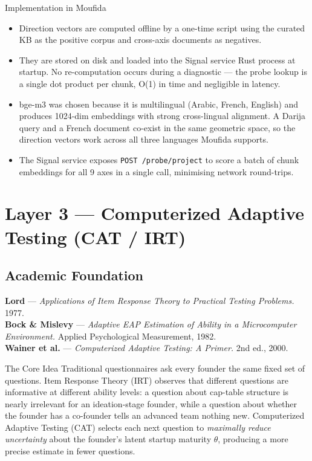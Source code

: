 \documentclass[11pt,a4paper]{article}
\begin{document}
\begin{implbox}{Implementation in Moufida}
\begin{itemize}[leftmargin=1em]
  \item Direction vectors are computed offline by a one-time script using the curated KB
        as the positive corpus and cross-axis documents as negatives.
  \item They are stored on disk and loaded into the Signal service Rust process at startup.
        No re-computation occurs during a diagnostic — the probe lookup is a single dot
        product per chunk, O(1) in time and negligible in latency.
  \item bge-m3 was chosen because it is multilingual (Arabic, French, English) and
        produces 1024-dim embeddings with strong cross-lingual alignment. A Darija query
        and a French document co-exist in the same geometric space, so the direction vectors
        work across all three languages Moufida supports.
  \item The Signal service exposes \texttt{POST /probe/project} to score a batch of chunk
        embeddings for all 9 axes in a single call, minimising network round-trips.
\end{itemize}
\end{implbox}

\section{Layer 3 — Computerized Adaptive Testing (CAT / IRT)}

\subsection{Academic Foundation}

\textbf{Lord} — \textit{Applications of Item Response Theory to Practical Testing Problems.} 1977.\\
\textbf{Bock \& Mislevy} — \textit{Adaptive EAP Estimation of Ability in a Microcomputer
Environment.} Applied Psychological Measurement, 1982.\\
\textbf{Wainer et al.} — \textit{Computerized Adaptive Testing: A Primer.} 2nd ed., 2000.

\begin{conceptbox}{The Core Idea}
Traditional questionnaires ask every founder the same fixed set of questions.
Item Response Theory (IRT) observes that different questions are informative at different
ability levels: a question about cap-table structure is nearly irrelevant for an
ideation-stage founder, while a question about whether the founder has a co-founder
tells an advanced team nothing new.
Computerized Adaptive Testing (CAT) selects each next question to \emph{maximally
reduce uncertainty} about the founder's latent startup maturity $\theta$, producing a
more precise estimate in fewer questions.
\end{conceptbox}
\end{document}
